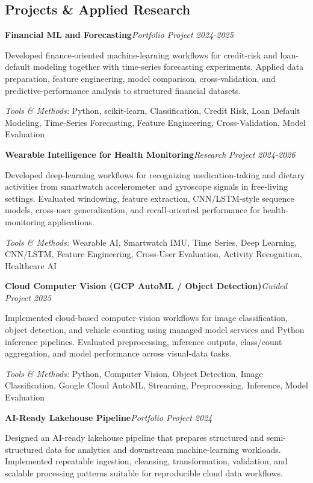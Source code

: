 \documentclass[9pt,letterpaper]{extarticle}
\newcommand{\entry}[2]{\Needspace{4\baselineskip}\textbf{#1}\hfill\textit{#2}\par}
\begin{document}
\subsection{Projects \& Applied Research}
\entry{Financial ML and Forecasting}{Portfolio Project \textbar{} 2024-2025}
Developed finance-oriented machine-learning workflows for credit-risk and loan-default modeling together with time-series forecasting experiments. Applied data preparation, feature engineering, model comparison, cross-validation, and predictive-performance analysis to structured financial datasets.\par
{\small\textit{Tools \& Methods:} Python, scikit-learn, Classification, Credit Risk, Loan Default Modeling, Time-Series Forecasting, Feature Engineering, Cross-Validation, Model Evaluation\par}
\vspace{1pt}
\entry{Wearable Intelligence for Health Monitoring}{Research Project \textbar{} 2024-2026}
Developed deep-learning workflows for recognizing medication-taking and dietary activities from smartwatch accelerometer and gyroscope signals in free-living settings. Evaluated windowing, feature extraction, CNN/LSTM-style sequence models, cross-user generalization, and recall-oriented performance for health-monitoring applications.\par
{\small\textit{Tools \& Methods:} Wearable AI, Smartwatch IMU, Time Series, Deep Learning, CNN/LSTM, Feature Engineering, Cross-User Evaluation, Activity Recognition, Healthcare AI\par}
\vspace{1pt}
\entry{Cloud Computer Vision (GCP AutoML / Object Detection)}{Guided Project \textbar{} 2025}
Implemented cloud-based computer-vision workflows for image classification, object detection, and vehicle counting using managed model services and Python inference pipelines. Evaluated preprocessing, inference outputs, class/count aggregation, and model performance across visual-data tasks.\par
{\small\textit{Tools \& Methods:} Python, Computer Vision, Object Detection, Image Classification, Google Cloud AutoML, Streaming, Preprocessing, Inference, Model Evaluation\par}
\vspace{1pt}
\entry{AI-Ready Lakehouse Pipeline}{Portfolio Project \textbar{} 2024}
Designed an AI-ready lakehouse pipeline that prepares structured and semi-structured data for analytics and downstream machine-learning workloads. Implemented repeatable ingestion, cleansing, transformation, validation, and scalable processing patterns suitable for reproducible cloud data workflows.\par
\end{document}
